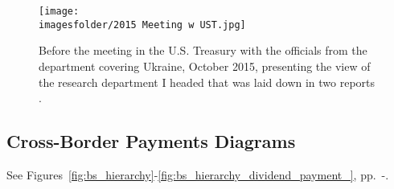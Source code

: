 \begin{figure}[!htbp]
    \captionsetup{width=1\linewidth,labelfont=bf}
    \centering
    \texttt{[image: \\imagesfolder/2015 Meeting w UST.jpg]}
    \caption[Before the meeting in the U.S. Treasury with the officials from the department covering Ukraine, October 2015]%
    {Before the meeting in the U.S. Treasury with the officials from the department covering Ukraine, October 2015, presenting the view of the research department I headed that was laid down in two reports \citep{valchyshen_2015_,valchyshen_2015}.}
    \label{fig:us_treasury_2015}
\end{figure}


\subsection{Cross-Border Payments Diagrams}

See Figures~\ref{fig:bs_hierarchy}-\ref{fig:bs_hierarchy_dividend_payment_}, pp.~\pageref{fig:bs_hierarchy}-\pageref{fig:bs_hierarchy_dividend_payment_}.

